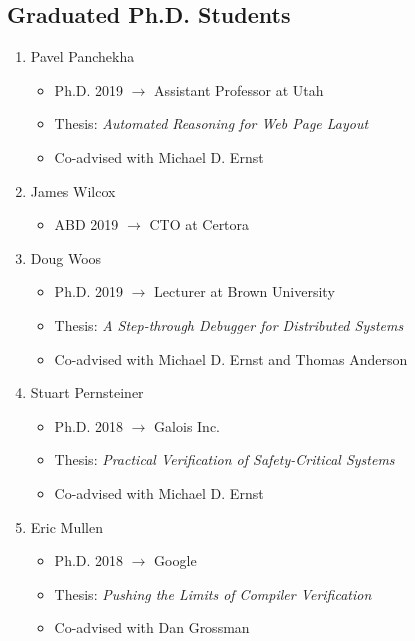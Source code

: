\documentclass[10pt]{article}
\begin{document}
\subsection*{Graduated Ph.D. Students}

\begin{enumerate}[resume]
  \item Pavel Panchekha
    \begin{itemize}
      \item Ph.D. 2019 $\rightarrow$ Assistant Professor at Utah
      \item Thesis: \textit{Automated Reasoning for Web Page Layout}
      \item Co-advised with Michael D. Ernst
    \end{itemize}

  \item James Wilcox
    \begin{itemize}
      \item ABD 2019 $\rightarrow$ CTO at Certora
    \end{itemize}

  \item Doug Woos
    \begin{itemize}
      \item Ph.D. 2019 $\rightarrow$ Lecturer at Brown University
      \item Thesis: \textit{A Step-through Debugger for Distributed Systems}
      \item Co-advised with Michael D. Ernst and Thomas Anderson
    \end{itemize}

  \item Stuart Pernsteiner
    \begin{itemize}
      \item Ph.D. 2018 $\rightarrow$ Galois Inc.
      \item Thesis: \textit{Practical Verification of Safety-Critical Systems}
      \item Co-advised with Michael D. Ernst
    \end{itemize}

  \item Eric Mullen
    \begin{itemize}
      \item Ph.D. 2018 $\rightarrow$ Google
      \item Thesis: \textit{Pushing the Limits of Compiler Verification}
      \item Co-advised with Dan Grossman
    \end{itemize}


\end{enumerate}
\end{document}
